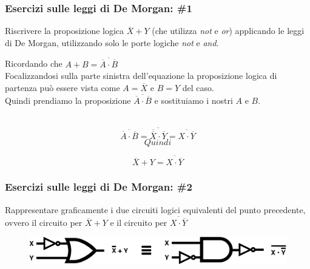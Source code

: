 \begin{frame}
	\frametitle{Esercizi sulle leggi di De Morgan: \#1}

	\begin{block}{Riscrivere la proposizione logica $\overline{X} + Y$ (che utilizza \textit{not} e \textit{or}) applicando le leggi di De Morgan, utilizzando solo le porte logiche \textit{not} e \textit{and}.}
		
		Ricordando che $A + B = \overline{\overline {A} \cdot \overline {B}}$\\
		\pause
		Focalizzandosi sulla parte sinistra dell'equazione la proposizione logica di partenza può essere vista come $A = \overline {X}$ e $B = Y$ del caso.\\
		\pause
		Quindi prendiamo la proposizione $\overline{\overline {A} \cdot \overline {B}}$ e sostituiamo i nostri $A$ e $B$.\\~\\
		\pause
		
		$$\overline{\overline {A} \cdot \overline {B}} = \overline{\overline {\overline {X}} \cdot \overline {Y}} = \overline{X \cdot \overline {Y}}$$
		\pause
		$$Quindi$$
		
		$$\overline{X} + Y = \overline{X \cdot \overline {Y}}$$ 
		
		
			
	\end{block}
	
\end{frame}


\begin{frame}
	\frametitle{Esercizi sulle leggi di De Morgan: \#2}

	\begin{block}{Rappresentare graficamente i due circuiti logici equivalenti del punto precedente, ovvero il circuito per $\overline{X} + Y$ e il circuito per $\overline{X \cdot \overline {Y}}$}
		\vspace{1em}
		\pause
		\begin{figure}[!htbp]
			\centering 
			\includegraphics[width=0.8\linewidth]{images/2_elettronica/demorgan_ex.pdf}
		\end{figure}
			
	\end{block}
	
\end{frame}




